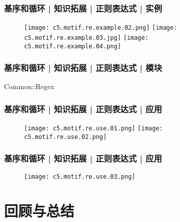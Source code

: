 \begin{frame}
  \frametitle{基序和循环 | 知识拓展 | 正则表达式 | 实例}
  \begin{figure}
    \centering
    \texttt{[image: c5.motif.re.example.02.png]}
    \texttt{[image: c5.motif.re.example.03.jpg]}
    \vspace{0.51em}
    \texttt{[image: c5.motif.re.example.04.png]}
  \end{figure}
\end{frame}

\begin{frame}
  \frametitle{基序和循环 | 知识拓展 | 正则表达式 | 模块}
  \begin{block}{Common::Regex}
  \end{block}
\end{frame}

\begin{frame}
  \frametitle{基序和循环 | 知识拓展 | 正则表达式 | 应用}
  \begin{figure}
    \centering
    \texttt{[image: c5.motif.re.use.01.png]}\quad
    \texttt{[image: c5.motif.re.use.02.png]}
  \end{figure}
\end{frame}

\begin{frame}
  \frametitle{基序和循环 | 知识拓展 | 正则表达式 | 应用}
  \begin{figure}
    \centering
    \texttt{[image: c5.motif.re.use.03.png]}
  \end{figure}
\end{frame}

\section{回顾与总结}
